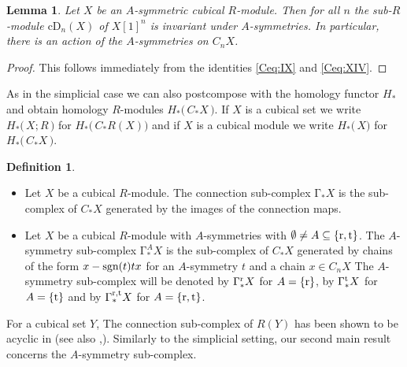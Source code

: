 \documentclass[12pt]{amsart}
\theoremstyle{plain}
\newtheorem{lemma}{Lemma}
\numberwithin{lemma}{\DefaultNumberTheoremWithin}
\numberwithin{claim}{\DefaultNumberTheoremWithin}
\numberwithin{theorem}{\DefaultNumberTheoremWithin}
\numberwithin{corollary}{\DefaultNumberTheoremWithin}
\numberwithin{proposition}{\DefaultNumberTheoremWithin}
\numberwithin{conjecture}{\DefaultNumberTheoremWithin}
\theoremstyle{definition}
\newtheorem*{definition}{Definition}
\theoremstyle{definition}
\numberwithin{question}{\DefaultNumberTheoremWithin}
\theoremstyle{definition}
\numberwithin{problem}{\DefaultNumberTheoremWithin}
\theoremstyle{remark}
\numberwithin{remark}{\DefaultNumberTheoremWithin}
\theoremstyle{remark}
\numberwithin{example}{\DefaultNumberTheoremWithin}
\def\blt{*}
\def\sgn{\textnormal{sgn}}
\def\rev{\textnormal{r}}
\def\trp{\textnormal{t}}
\def\cDeg{\mathrm{cD}}     %
\def\Con{\mathrm{\Gamma}}  %
\def\tCon{\Con^{\trp}}   %
\def\rCon{\Con^{\rev}}   %
\def\rtCon{\Con^{\rev,\trp}} %
\def\ACon{\Con^A} %
\newcommand{\firstappearence}[1]{{\sf #1}}
\begin{document}
\begin{lemma}
   Let $X$ be an $A$-symmetric cubical $R$-module. Then for all $n$ the sub-$R$-module 
   $\cDeg_n(X)$ of $X[1]^n$ is invariant under $A$-symmetries. In particular, there is an action of the 
   $A$-symmetries on $C_nX$.
\end{lemma} 
\begin{proof}
    This follows immediately from the identities \ref{Ceq:IX} and \ref{Ceq:XIV}.
\end{proof}

As in the simplicial case we can also postcompose with the homology functor 
$H_\blt$ 
and obtain homology $R$-modules $H_\blt \big(\,C_\blt X\,\big)$. If $X$ is a cubical set we
write $H_\blt\big(\,X;R\,\big)$ 
for $H_\blt \big(\,C_\blt R(X) \big)$
and if $X$ is a cubical module we write $H_\blt\big(\,X\big)$ 
for $H_\blt \big(\,C_\blt X\,\big)$.

\begin{definition}~
\begin{itemize}
        \item[($\Con$)]  Let $X$ be a cubical $R$-module. The \firstappearence{connection sub-complex} $\Con_\blt X$ is the sub-complex of $C_\blt X$ generated by the images of the connection maps.
    \item[($\ACon$)] Let $X$ be a cubical $R$-module with $A$-symmetries with $\emptyset \neq A \subseteq\{\rev,\trp\}$. The \firstappearence{$A$-symmetry sub-complex} $\ACon_\blt X$ is the sub-complex of $C_\blt X$ generated by
         chains of the form $x-\sgn(t)tx$ for an $A$-symmetry $t$ and a chain $x\in C_n X$
        The $A$-symmetry sub-complex will be denoted by $\rCon_\blt X$ for $A=\{\rev\}$, by $\tCon_\blt X$ for $A=\{\trp\}$ and by $\rtCon_\blt X$ for $A=\{ \rev,\trp \}$. 
        \end{itemize}
\end{definition}
For a cubical set $Y$, The connection sub-complex of $R(Y)$ has been shown to be acyclic in \cite{HomologyConnections} (see also \cite{CKT},\cite{DohertyConnections}).
Similarly to the simplicial setting, our second main result concerns the $A$-symmetry sub-complex.  
\end{document}

